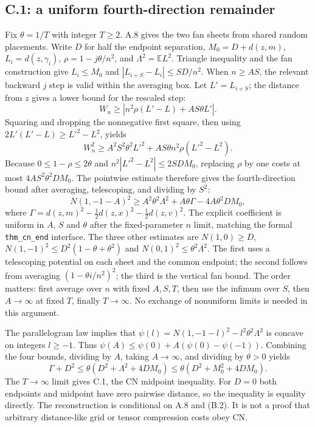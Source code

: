 \documentclass[11pt,letterpaper]{article}
\begin{document}
\subsection{C.1: a uniform fourth-direction remainder}
Fix $\theta=1/T$ with integer $T\ge2$. A.8 gives the two fan sheets from shared random placements. Write $D$ for half the endpoint separation, $M_0=D+d(z,m)$, $L_i=d(z,\gamma_i)$, $\rho=1-j\theta/n^2$, and $\Lambda^2=\mathbb E L^2$. Triangle inequality and the fan construction give $L_i\le M_0$ and $|L_{i+S}-L_i|\le SD/n^2$. When $n\ge AS$, the relevant backward $j$ step is valid within the averaging box. Let $L'=L_{i+S}$; the distance from $z$ gives a lower bound for the rescaled step:
\[
 W_n\ge|n^2\rho(L'-L)+AS\theta L'|.
\]
Squaring and dropping the nonnegative first square, then using $2L'(L'-L)\ge L'^2-L^2$, yields
\[
W_n^2\ge A^2S^2\theta^2L'^2+AS\theta n^2\rho(L'^2-L^2).
\]
Because $0\le1-\rho\le2\theta$ and $n^2|L'^2-L^2|\le2SDM_0$, replacing $\rho$ by one costs at most $4AS^2\theta^2DM_0$. The pointwise estimate therefore gives the fourth-direction bound after averaging, telescoping, and dividing by $S^2$:
\[
N(1,-1-A)^2\ge A^2\theta^2\Lambda^2+A\theta\Gamma-4A\theta^2DM_0,
\]
where $\Gamma=d(z,m)^2-\tfrac12 d(z,x)^2-\tfrac12d(z,v)^2$. The explicit coefficient is uniform in $A$, $S$ and $\theta$ after the fixed-parameter $n$ limit, matching the formal \texttt{thm\_cn\_end} interface. The three other estimates are $N(1,0)\ge D$, $N(1,-1)^2\le D^2(1-\theta+\theta^2)$ and $N(0,1)^2\le\theta^2\Lambda^2$. The first uses a telescoping potential on each sheet and the common endpoint; the second follows from averaging $(1-\theta i/n^2)^2$; the third is the vertical fan bound. The order matters: first average over $n$ with fixed $A,S,T$, then use the infimum over $S$, then $A\to\infty$ at fixed $T$, finally $T\to\infty$. No exchange of nonuniform limits is needed in this argument.

The parallelogram law implies that $\psi(l)=N(1,-1-l)^2-l^2\theta^2\Lambda^2$ is concave on integers $l\ge-1$. Thus $\psi(A)\le\psi(0)+A(\psi(0)-\psi(-1))$. Combining the four bounds, dividing by $A$, taking $A\to\infty$, and dividing by $\theta>0$ yields
\[
\Gamma+D^2\le\theta(D^2+\Lambda^2+4DM_0)\le\theta(D^2+M_0^2+4DM_0).
\]
The $T\to\infty$ limit gives C.1, the CN midpoint inequality. For $D=0$ both endpoints and midpoint have zero pairwise distance, so the inequality is equality directly. The reconstruction is conditional on A.8 and (B.2). It is not a proof that arbitrary distance-like grid or tensor compression costs obey CN.
\end{document}
